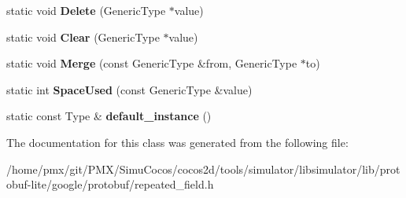\begin{DoxyCompactItemize}
static void {\bfseries Delete} (Generic\+Type $\ast$value)
\item 
\mbox{\label{classgoogle_1_1protobuf_1_1internal_1_1GenericTypeHandler_a9d2a7de9a534b13a3ec10345f260b15a}} 
static void {\bfseries Clear} (Generic\+Type $\ast$value)
\item 
\mbox{\label{classgoogle_1_1protobuf_1_1internal_1_1GenericTypeHandler_a97d61c9f3de880e15069829e06f8e622}} 
static void {\bfseries Merge} (const Generic\+Type \&from, Generic\+Type $\ast$to)
\item 
\mbox{\label{classgoogle_1_1protobuf_1_1internal_1_1GenericTypeHandler_a58e4f76bb1f7b4473e2c4aab40082f35}} 
static int {\bfseries Space\+Used} (const Generic\+Type \&value)
\item 
\mbox{\label{classgoogle_1_1protobuf_1_1internal_1_1GenericTypeHandler_ab4cf89778f0aee2ea6a4acefb742ea58}} 
static const Type \& {\bfseries default\+\_\+instance} ()
\end{DoxyCompactItemize}


The documentation for this class was generated from the following file\+:\begin{DoxyCompactItemize}
\item 
/home/pmx/git/\+P\+M\+X/\+Simu\+Cocos/cocos2d/tools/simulator/libsimulator/lib/protobuf-\/lite/google/protobuf/repeated\+\_\+field.\+h\end{DoxyCompactItemize}
